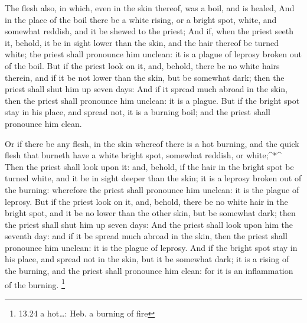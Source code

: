  The flesh also, in which, even in the skin thereof, was a
boil, and is healed,  And in the place of the boil there be
a white rising, or a bright spot, white, and somewhat reddish, and it be
shewed to the priest;  And if, when the priest seeth it,
behold, it be in sight lower than the skin, and the hair thereof be
turned white; the priest shall pronounce him unclean: it is a plague of
leprosy broken out of the boil.  But if the priest look on
it, and, behold, there be no white hairs therein, and if it be not lower
than the skin, but be somewhat dark; then the priest shall shut him up
seven days:  And if it spread much abroad in the skin, then
the priest shall pronounce him unclean: it is a plague. 
But if the bright spot stay in his place, and spread not, it is a
burning boil; and the priest shall pronounce him clean.

 Or if there be any flesh, in the skin whereof there is a
hot burning, and the quick flesh that burneth have a white bright spot,
somewhat reddish, or white;\^{}*\^{}  Then the priest shall
look upon it: and, behold, if the hair in the bright spot be turned
white, and it be in sight deeper than the skin; it is a leprosy broken
out of the burning: wherefore the priest shall pronounce him unclean: it
is the plague of leprosy.  But if the priest look on it,
and, behold, there be no white hair in the bright spot, and it be no
lower than the other skin, but be somewhat dark; then the priest shall
shut him up seven days:  And the priest shall look upon him
the seventh day: and if it be spread much abroad in the skin, then the
priest shall pronounce him unclean: it is the plague of leprosy.
 And if the bright spot stay in his place, and spread not
in the skin, but it be somewhat dark; it is a rising of the burning, and
the priest shall pronounce him clean: for it is an inflammation of the
burning. \footnote{13.24 a hot\ldots: Heb. a burning of fire}

